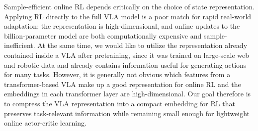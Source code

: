 Sample-efficient online RL depends critically on the choice of state representation. Applying RL directly to the full VLA model is a poor match for rapid real-world adaptation: the representation is high-dimensional, and online updates to the billion-parameter model are both computationally expensive and sample-inefficient. At the same time, we would like to utilize the representation already contained inside a VLA after pretraining, since it was trained on large-scale web and robotic data and already contains information useful for generating actions for many tasks. However, it is generally not obvious which features from a transformer-based VLA make up a good representation for online RL and the embeddings in each transformer layer are high-dimensional. Our goal therefore is to compress the VLA representation into a compact embedding for RL that preserves task-relevant  information while remaining small enough for lightweight online actor-critic learning.


